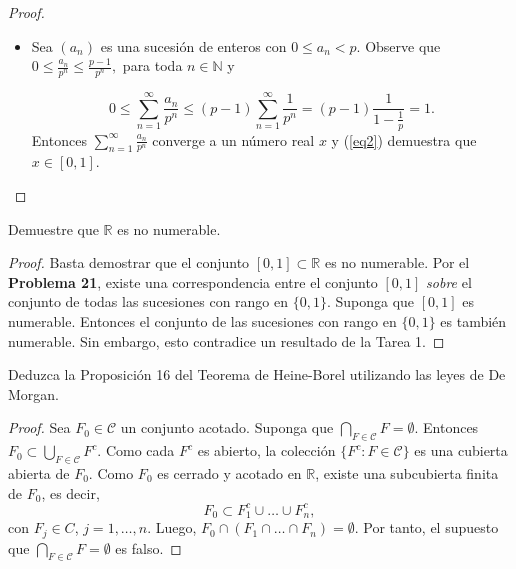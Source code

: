 \documentclass[12pt]{article}
\newcommand{\N}{\mathbb{N}}
\newcommand{\R}{\mathbb{R}}
\newenvironment{problem}[2][Problema]{\begin{trivlist}
\item[\hskip \labelsep {\bfseries #1}\hskip \labelsep {\bfseries #2.}]}{\end{trivlist}}
\begin{document}
\begin{proof}
\begin{itemize}
\item[iii.] Sea $(a_n)$ es una sucesión de enteros con $0 \leq a_n < p$. Observe que $0 \leq \frac{a_n}{p^n} \leq \frac{p-1}{p^n},$ para toda $n \in \N$ y 

\begin{equation}\label{eq2}
    0 \leq \sum_{n=1}^{\infty}\frac{a_n}{p^n} \leq (p-1) \sum_{n=1}^{\infty}\frac{1}{p^n} = (p - 1) \frac{1}{1 - \frac{1}{p}} =  1.
\end{equation}
Entonces $\sum_{n=1}^{\infty}\frac{a_n}{p^n}$ converge a un número real $x$ y (\ref{eq2}) demuestra que $x \in [0, 1]$.


\end{itemize}
\end{proof}


\begin{problem}{22}
Demuestre que $\R$ es no numerable.
\end{problem}
\begin{proof}
Basta demostrar que el conjunto $[0, 1] \subset \R$ es no numerable. Por el \textbf{Problema 21}, existe una correspondencia entre el conjunto $[0, 1]$ \textit{sobre} el conjunto de todas las sucesiones con rango en $\{0, 1\}$. Suponga que $[0, 1]$ es numerable. Entonces el conjunto de las sucesiones con rango en $\{0, 1\}$ es también numerable. Sin embargo, esto contradice un resultado de la Tarea 1. 


\end{proof}


\begin{problem}{34}
Deduzca la Proposición 16 del Teorema de Heine-Borel utilizando las leyes de De Morgan.

\end{problem}
\begin{proof}
Sea $F_0 \in \mathcal{C}$ un conjunto acotado. Suponga que $\bigcap_{F \in \mathcal{C}} F = \emptyset$. Entonces $F_0 \subset \bigcup_{F \in \mathcal{C}} F^c$. Como cada $F^c$ es abierto, la colección $\{F^c: F \in \mathcal{C} \}$ es una cubierta abierta de $F_0$. Como $F_0$ es cerrado y acotado en $\R$, existe una subcubierta finita de $F_0$, es decir, 
$$F_0 \subset F_1^c \cup \ldots \cup F_n^c, $$
con $F_j \in C$, $j = 1, \dots, n.$ Luego, $F_0 \cap (F_1 \cap \ldots \cap  F_n) = \emptyset$. Por tanto, el supuesto que $\bigcap_{F \in \mathcal{C}} F = \emptyset$ es falso.
\end{proof}
\end{document}
